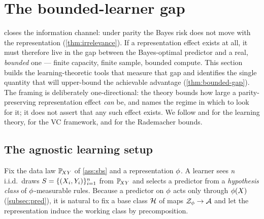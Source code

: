 \section{The bounded-learner gap}
\label{sec:bounded}

%
%

 closes the information channel: under parity the Bayes risk
does not move with the representation (\cref{thm:irrelevance}).
If a representation effect exists at all, it must therefore live in the gap
between the Bayes-optimal predictor and a real, \emph{bounded} one --- finite
capacity, finite sample, bounded compute. This section builds the
learning-theoretic tools that measure that gap and identifies the single
quantity that will upper-bound the achievable advantage (\cref{thm:bounded-gap}). The framing
is deliberately one-directional: the theory bounds how large a parity-preserving
representation effect \emph{can} be, and names the regime in which to look for
it; it does not assert that any such effect exists. We follow
\citet{shalevshwartz2014} and \citet{mohri2018} for the learning theory,
\citet{vapnik1998} for the VC framework, and \citet{bartlettmendelson2002} for
the Rademacher bounds.

\subsection{The agnostic learning setup}
\label{subsec:pac}

Fix the data law $\mathbb{P}_{\!XY}$ of \cref{ass:sbs} and a representation $\phi$. A
learner sees $n$ i.i.d.\ draws $S = \{(X_i,Y_i)\}_{i=1}^{n}$
from $\mathbb{P}_{\!XY}$ and selects a predictor from a \emph{hypothesis class} of
$\phi$-measurable rules. Because a predictor on $\phi$ acts only through
$\phi(X)$ (\cref{subsec:pred}), it is natural to fix a base class
$\mathcal{H}$ of maps $\mathcal{Z}_{\phi}\to\mathcal{A}$ and let the representation
induce the working class by precomposition.

